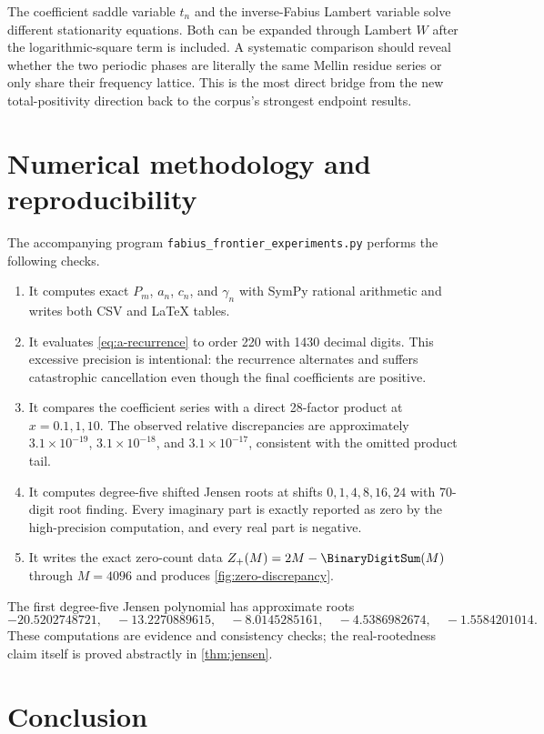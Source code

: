 \documentclass[11pt]{article}
\numberwithin{equation}{section}
\theoremstyle{definition}
\theoremstyle{remark}
\begin{document}
The coefficient saddle variable $t_n$ and the inverse-Fabius Lambert variable solve different stationarity equations.  Both can be expanded through Lambert $W$ after the logarithmic-square term is included.  A systematic comparison should reveal whether the two periodic phases are literally the same Mellin residue series or only share their frequency lattice.  This is the most direct bridge from the new total-positivity direction back to the corpus's strongest endpoint results.

\section{Numerical methodology and reproducibility}\label{sec:numerics}

The accompanying program \texttt{fabius\_frontier\_experiments.py} performs the following checks.
\begin{enumerate}[leftmargin=2.2em]
\item It computes exact $P_m$, $a_n$, $c_n$, and $\gamma_n$ with SymPy rational arithmetic and writes both CSV and LaTeX tables.
\item It evaluates \eqref{eq:a-recurrence} to order 220 with 1430 decimal digits.  This excessive precision is intentional: the recurrence alternates and suffers catastrophic cancellation even though the final coefficients are positive.
\item It compares the coefficient series with a direct 28-factor product at $x=0.1,1,10$.  The observed relative discrepancies are approximately $3.1\times10^{-19}$, $3.1\times10^{-18}$, and $3.1\times10^{-17}$, consistent with the omitted product tail.
\item It computes degree-five shifted Jensen roots at shifts $0,1,4,8,16,24$ with 70-digit root finding.  Every imaginary part is exactly reported as zero by the high-precision computation, and every real part is negative.
\item It writes the exact zero-count data $Z_+(M)=2M-\BinaryDigitSum(M)$ through $M=4096$ and produces \cref{fig:zero-discrepancy}.
\end{enumerate}

The first degree-five Jensen polynomial has approximate roots
\[
 -20.5202748721,\quad-13.2270889615,\quad-8.0145285161,
 \quad-4.5386982674,\quad-1.5584201014.
\]
These computations are evidence and consistency checks; the real-rootedness claim itself is proved abstractly in \cref{thm:jensen}.

\section{Conclusion}
\end{document}
